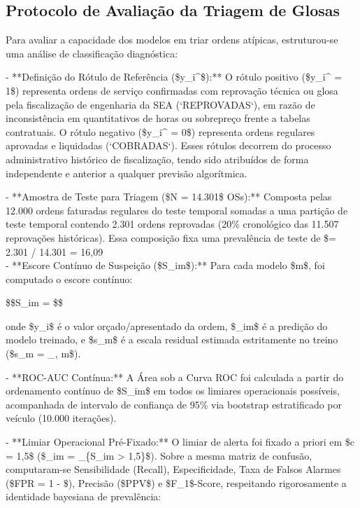 \documentclass[12pt,a4paper]{article}
\begin{document}
\subsection{Protocolo de Avaliação da Triagem de Glosas}

Para avaliar a capacidade dos modelos em triar ordens atípicas, estruturou-se uma análise de classificação diagnóstica:

- **Definição do Rótulo de Referência (\$y\_i^{}\$):** O rótulo positivo (\$y\_i^{} = 1\$) representa ordens de serviço confirmadas com reprovação técnica ou glosa pela fiscalização de engenharia da SEA (`REPROVADAS`), em razão de inconsistência em quantitativos de horas ou sobrepreço frente a tabelas contratuais. O rótulo negativo (\$y\_i^{} = 0\$) representa ordens regulares aprovadas e liquidadas (`COBRADAS`). Esses rótulos decorrem do processo administrativo histórico de fiscalização, tendo sido atribuídos de forma independente e anterior a qualquer previsão algorítmica.

- **Amostra de Teste para Triagem (\$N = 14.301\$ OSs):** Composta pelas 12.000 ordens faturadas regulares do teste temporal somadas a uma partição de teste temporal contendo 2.301 ordens reprovadas (20\% cronológico das 11.507 reprovações históricas). Essa composição fixa uma prevalência de teste de \$\pi = 2.301 / 14.301 = 16,09\\%

- **Escore Contínuo de Suspeição (\$S\_{im}\$):** Para cada modelo \$m\$, foi computado o escore contínuo:

\$\$S\_{im} =  \$\$

onde \$y\_i\$ é o valor orçado/apresentado da ordem, \$\_{im}\$ é a predição do modelo treinado, e \$s\_m\$ é a escala residual estimada estritamente no treino (\$s\_m = \_{, m}\$).

- **ROC-AUC Contínua:** A Área sob a Curva ROC foi calculada a partir do ordenamento contínuo de \$S\_{im}\$ em todos os limiares operacionais possíveis, acompanhada de intervalo de confiança de 95\% via bootstrap estratificado por veículo (10.000 iterações).

- **Limiar Operacional Pré-Fixado:** O limiar de alerta foi fixado a priori em \$c = 1,5\$ (\$\_{im} = \_{\{S\_{im} > 1,5\}}\$). Sobre a mesma matriz de confusão, computaram-se Sensibilidade (Recall), Especificidade, Taxa de Falsos Alarmes (\$FPR = 1 - \$), Precisão (\$PPV\$) e \$F\_1\$-Score, respeitando rigorosamente a identidade bayesiana de prevalência:
\end{document}
